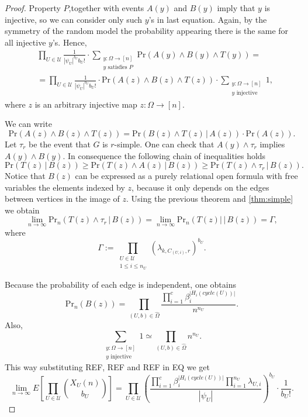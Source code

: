 \documentclass[11pt,notitlepage,a4paper]{article}
\theoremstyle{definition}
\newcommand{\Ln}{\lim\limits_{n\to \infty}}
\begin{document}
\begin{proof}
	Property $P$,together with events $A(y)$ and $B(y)$ imply that $y$ is
	injective, so we can consider only such $y$'s in last equation. Again, by 
	the symmetry of the random model the probability appearing there is the same
	for all injective $y$'s. Hence,
	\begin{align}
	\nonumber
	&\prod_{U\in \mathcal{U}} 
	\frac{1}{|\psi_U|^{b_U}b_U!} \cdot
	\sum_{\substack{y:\Omega \rightarrow [n]\\y \text{ satisfies }P}}
	\mathrm{Pr}(A(y)\wedge B(y)\wedge T(y))= \\ 
	\label{eqn:distributed3}
	& =\prod_{U\in \mathcal{U}} 
	\frac{1}{|\psi_U|^{b_U}b_U!} \cdot \mathrm{Pr}(A(z)\wedge B(z)\wedge T(z)) \cdot
	\sum_{\substack{y:\Omega \rightarrow [n]\\y \text{ injective }}}1,
	\end{align}
	where $z$ is an arbitrary injective map $z:\Omega\rightarrow [n]$.\par
	We can write 
	\[\mathrm{Pr}(A(z)\wedge B(z)\wedge T(z))=\mathrm{Pr}(B(z)\wedge T(z) \, |\, A(z)) \cdot 
	\mathrm{Pr}(A(z)).\]
	Let $\tau_r$ be the event that $G$ is $r$-simple. One can check that
	$A(y) \wedge \tau_r$ implies $A(y)\wedge B(y)$. 
	In consequence the following chain of inequalities holds
	\[\mathrm{Pr}(T(z)\,|\, B(z))\geq \mathrm{Pr}(T(z)\wedge A(z) \,| \, B(z)) \geq
	 \mathrm{Pr}(T(z)\wedge \tau_r \,| \, B(z)).\]
	Notice that $B(z)$ can be expressed as a purely relational open formula
	with free variables the elements indexed by $z$, because it only depends on
	the edges between vertices in the image of $z$.
	Using the previous theorem and \cref{thm:simple} we obtain
	\[\Ln \mathrm{Pr}_n(T(z)\wedge \tau_r \,| \, B(z))= \Ln \mathrm{Pr}_n(T(z)| \,| \, B(z)) = \Gamma, \]
	where
	\[ \Gamma:=\prod_{\substack{U\in \mathcal{U}\\ 1 \leq i\leq n_{U}}}
	(\lambda_{k,C_{(U,i)}, r})^{b_U}.\]
	
	Because the probability of each edge is independent, one obtains 
	\[ \mathrm{Pr}_n(B(z))= \prod_{(U,b)\in \widehat{\Omega}} 
	\frac{\prod_{i=1}^c	\beta_i^{|H_i(cycle(U))|}}{n^{n_U}}.  \]
	Also,
	\[\sum_{\substack{y:\Omega \rightarrow [n]\\y \text{ injective }}}1
	\simeq \prod_{(U,b)\in \widehat{\Omega}} n^{n_U}. \]
	This way substituting REF, REF and REF in EQ we get
	\[\Ln E\left[\prod_{U\in \mathcal{U}}
	\binom{X_{U}(n)}{b_{U}}\right]= \prod_{U\in \mathcal{U}}
	\left(\frac{ \prod_{i=1}^c \beta_i^{|H_i(cycle(U))|} \prod_{i=1}^{n_U} \lambda_{U,i}}{|\psi_U|}\right)^{b_U}\cdot \frac{1}{b_{U}!}. \]
	

\end{proof}
\end{document}
